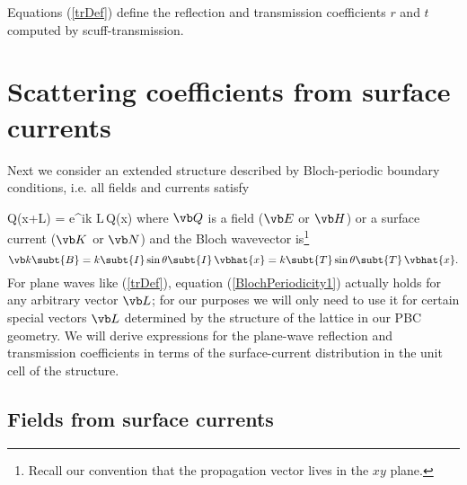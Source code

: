 \documentclass[letterpaper]{article}
\begin{document}
Equations (\ref{trDef})
define the reflection and transmission coefficients
$r$ and $t$ computed by {\sc scuff-transmission}.

\newpage
\section{Scattering coefficients from surface currents}

Next we consider an extended structure described by Bloch-periodic
boundary conditions, i.e. all fields and currents satisfy 

{\vb Q(\vb x+\vb L) = e^{i\vb k \cdot \vb L}\,\vb Q(\vb x)}
where $\vb Q$ is a field ($\vb E$ or $\vb H$) or a surface current
($\vb K$ or $\vb N$) and the Bloch wavevector is\footnote{Recall
our convention that the propagation vector lives
in the $xy$ plane.}
$$\vb k\subt{B}=k\subt{I}\sin\theta\subt{I} \, \vbhat{x}
               =k\subt{T}\sin\theta\subt{T} \, \vbhat{x}.
$$
For plane waves like (\ref{trDef}), equation (\ref{BlochPeriodicity1})
actually holds for any arbitrary vector $\vb L$; for our
purposes we will only need to use it for certain special
vectors $\vb L$ determined by the structure of the lattice in
our PBC geometry.
We will derive expressions for the
plane-wave reflection and transmission coefficients in terms
of the surface-current distribution in the unit cell of the structure.


\subsection*{Fields from surface currents}
\end{document}
